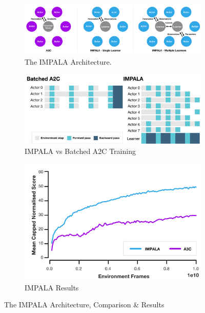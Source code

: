 \begin{figure}[H]
	\centering
	\begin{subfigure}[b]{0.3\textwidth}
		\centering
		\includegraphics[width=\textwidth]{figures/algos/impala.png}
		\caption{The IMPALA Architecture.}
		\label{fig:impala_arch}
    \end{subfigure}
    \hfill
    \begin{subfigure}[b]{0.3\textwidth}
		\centering
		\includegraphics[width=\textwidth]{figures/algos/impala_vs_a2c.png}
		\caption{IMPALA vs Batched A2C Training}
		\label{fig:impala_vs_a2c}
    \end{subfigure}
    \hfill
	\begin{subfigure}[b]{0.3\textwidth}
		\centering
		\includegraphics[width=\textwidth]{figures/algos/impala_results.png}
        \caption{IMPALA Results}
		\label{fig:impala_results}
	\end{subfigure}
	\hfill
	   \caption{The IMPALA Architecture, Comparison \& Results}
	   \label{fig:impala}
\end{figure}

